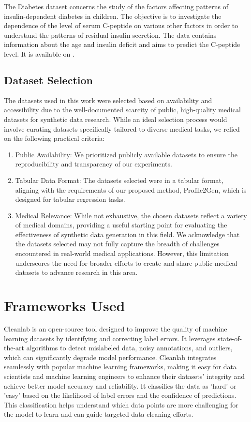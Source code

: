 \documentclass{article}
\theoremstyle{plain}
\theoremstyle{definition}
\theoremstyle{remark}
\begin{document}
The Diabetes dataset \cite{Torgo} concerns the study of the factors affecting patterns of insulin-dependent diabetes in children. The objective is to investigate the dependence of the level of serum C-peptide on various other factors in order to understand the patterns of residual insulin secretion. The data contains information about the age and insulin deficit and aims to predict the C-peptide level. It is available on \cite{OpenML212}. 

\subsection{Dataset Selection}
The datasets used in this work were selected based on availability and accessibility due to the well-documented scarcity of public, high-quality medical datasets for synthetic data research. While an ideal selection process would involve curating datasets specifically tailored to diverse medical tasks, we relied on the following practical criteria:
\begin{enumerate}
    \item 
    Public Availability: We prioritized publicly available datasets to ensure the reproducibility and transparency of our experiments.
\item Tabular Data Format: The datasets selected were in a tabular format, aligning with the requirements of our proposed method, Profile2Gen, which is designed for tabular regression tasks.
\item Medical Relevance: While not exhaustive, the chosen datasets reflect a variety of medical domains, providing a useful starting point for evaluating the effectiveness of synthetic data generation in this field.
We acknowledge that the datasets selected may not fully capture the breadth of challenges encountered in real-world medical applications. However, this limitation underscores the need for broader efforts to create and share public medical datasets to advance research in this area.
\end{enumerate}
\section{Frameworks Used} \label{sec:appendiceadaptingdataiq}
Cleanlab \cite{article} is an open-source tool designed to improve the quality of machine learning datasets by identifying and correcting label errors. It leverages state-of-the-art algorithms to detect mislabeled data, noisy annotations, and outliers, which can significantly degrade model performance. Cleanlab integrates seamlessly with popular machine learning frameworks, making it easy for data scientists and machine learning engineers to enhance their datasets' integrity and achieve better model accuracy and reliability. It classifies the data as 'hard' or 'easy' based on the likelihood of label errors and the confidence of predictions. This classification helps understand which data points are more challenging for the model to learn and can guide targeted data-cleaning efforts. 
\end{document}
